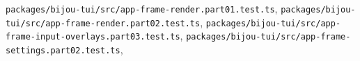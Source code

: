 \begin{itemize}
\texttt{p\allowbreak{}a\allowbreak{}c\allowbreak{}k\allowbreak{}a\allowbreak{}g\allowbreak{}e\allowbreak{}s\allowbreak{}/\allowbreak{}b\allowbreak{}i\allowbreak{}j\allowbreak{}o\allowbreak{}u\allowbreak{}-\allowbreak{}t\allowbreak{}u\allowbreak{}i\allowbreak{}/\allowbreak{}s\allowbreak{}r\allowbreak{}c\allowbreak{}/\allowbreak{}a\allowbreak{}p\allowbreak{}p\allowbreak{}-\allowbreak{}f\allowbreak{}r\allowbreak{}a\allowbreak{}m\allowbreak{}e\allowbreak{}-\allowbreak{}r\allowbreak{}e\allowbreak{}n\allowbreak{}d\allowbreak{}e\allowbreak{}r\allowbreak{}.\allowbreak{}p\allowbreak{}a\allowbreak{}r\allowbreak{}t\allowbreak{}0\allowbreak{}1\allowbreak{}.\allowbreak{}t\allowbreak{}e\allowbreak{}s\allowbreak{}t\allowbreak{}.\allowbreak{}t\allowbreak{}s}, \texttt{p\allowbreak{}a\allowbreak{}c\allowbreak{}k\allowbreak{}a\allowbreak{}g\allowbreak{}e\allowbreak{}s\allowbreak{}/\allowbreak{}b\allowbreak{}i\allowbreak{}j\allowbreak{}o\allowbreak{}u\allowbreak{}-\allowbreak{}t\allowbreak{}u\allowbreak{}i\allowbreak{}/\allowbreak{}s\allowbreak{}r\allowbreak{}c\allowbreak{}/\allowbreak{}a\allowbreak{}p\allowbreak{}p\allowbreak{}-\allowbreak{}f\allowbreak{}r\allowbreak{}a\allowbreak{}m\allowbreak{}e\allowbreak{}-\allowbreak{}r\allowbreak{}e\allowbreak{}n\allowbreak{}d\allowbreak{}e\allowbreak{}r\allowbreak{}.\allowbreak{}p\allowbreak{}a\allowbreak{}r\allowbreak{}t\allowbreak{}0\allowbreak{}2\allowbreak{}.\allowbreak{}t\allowbreak{}e\allowbreak{}s\allowbreak{}t\allowbreak{}.\allowbreak{}t\allowbreak{}s}, \texttt{p\allowbreak{}a\allowbreak{}c\allowbreak{}k\allowbreak{}a\allowbreak{}g\allowbreak{}e\allowbreak{}s\allowbreak{}/\allowbreak{}b\allowbreak{}i\allowbreak{}j\allowbreak{}o\allowbreak{}u\allowbreak{}-\allowbreak{}t\allowbreak{}u\allowbreak{}i\allowbreak{}/\allowbreak{}s\allowbreak{}r\allowbreak{}c\allowbreak{}/\allowbreak{}a\allowbreak{}p\allowbreak{}p\allowbreak{}-\allowbreak{}f\allowbreak{}r\allowbreak{}a\allowbreak{}m\allowbreak{}e\allowbreak{}-\allowbreak{}i\allowbreak{}n\allowbreak{}p\allowbreak{}u\allowbreak{}t\allowbreak{}-\allowbreak{}o\allowbreak{}v\allowbreak{}e\allowbreak{}r\allowbreak{}l\allowbreak{}a\allowbreak{}y\allowbreak{}s\allowbreak{}.\allowbreak{}p\allowbreak{}a\allowbreak{}r\allowbreak{}t\allowbreak{}0\allowbreak{}3\allowbreak{}.\allowbreak{}t\allowbreak{}e\allowbreak{}s\allowbreak{}t\allowbreak{}.\allowbreak{}t\allowbreak{}s}, \texttt{p\allowbreak{}a\allowbreak{}c\allowbreak{}k\allowbreak{}a\allowbreak{}g\allowbreak{}e\allowbreak{}s\allowbreak{}/\allowbreak{}b\allowbreak{}i\allowbreak{}j\allowbreak{}o\allowbreak{}u\allowbreak{}-\allowbreak{}t\allowbreak{}u\allowbreak{}i\allowbreak{}/\allowbreak{}s\allowbreak{}r\allowbreak{}c\allowbreak{}/\allowbreak{}a\allowbreak{}p\allowbreak{}p\allowbreak{}-\allowbreak{}f\allowbreak{}r\allowbreak{}a\allowbreak{}m\allowbreak{}e\allowbreak{}-\allowbreak{}s\allowbreak{}e\allowbreak{}t\allowbreak{}t\allowbreak{}i\allowbreak{}n\allowbreak{}g\allowbreak{}s\allowbreak{}.\allowbreak{}p\allowbreak{}a\allowbreak{}r\allowbreak{}t\allowbreak{}0\allowbreak{}2\allowbreak{}.\allowbreak{}t\allowbreak{}e\allowbreak{}s\allowbreak{}t\allowbreak{}.\allowbreak{}t\allowbreak{}s}, 
\end{itemize}
